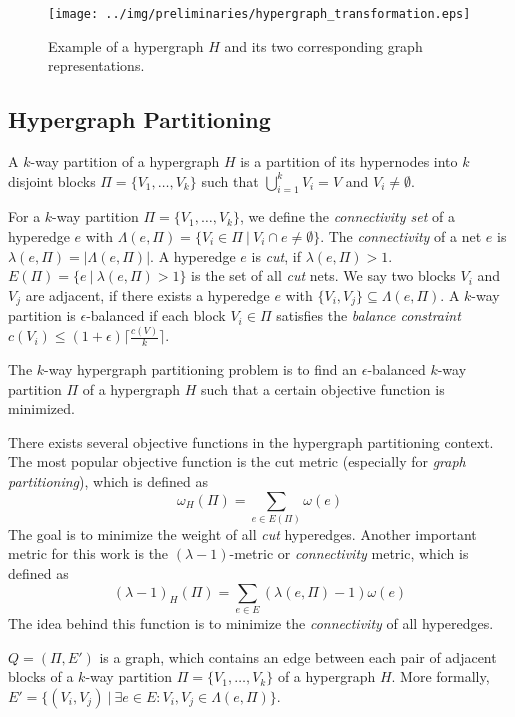 \begin{figure}
\centering
\texttt{[image: ../img/preliminaries/hypergraph\_transformation.eps]}
\caption{Example of a hypergraph $H$ and its two corresponding graph representations.} 
\label{img:hypergraph_transformation}
\end{figure}

\subsection{Hypergraph Partitioning}
\label{sec:hypergraph_partitioning}

\begin{definition}
A $k$-way partition of a hypergraph $H$ is a partition of its hypernodes into
$k$ disjoint blocks $\Pi = \{V_1,\ldots,V_k\}$ such that $\bigcup_{i=1}^{k} V_i = V$
and $V_i \neq \emptyset$.
\label{def:kway_partition}
\end{definition}

For a $k$-way partition $\Pi = \{V_1,\ldots,V_k\}$, we define the \emph{connectivity set} of a
hyperedge $e$ with $\Lambda(e,\Pi) = \{V_i \in \Pi\ |\ V_i \cap e \neq \emptyset\}$. The \emph{connectivity}
of a net $e$ is $\lambda(e,\Pi) = |\Lambda(e,\Pi)|$. A hyperedge $e$ is \emph{cut}, if
$\lambda(e,\Pi) > 1$. $E(\Pi) = \{e\ |\ \lambda(e,\Pi) > 1\}$ is the set of all \emph{cut} 
nets. We say two blocks $V_i$ and $V_j$ are adjacent, if there exists a hyperedge
$e$ with $\{V_i,V_j\} \subseteq \Lambda(e,\Pi)$. 
A $k$-way partition is $\epsilon$-balanced 
if each block $V_i \in \Pi$ satisfies the \emph{balance constraint} 
$c(V_i) \le (1+\epsilon)\lceil\frac{c(V)}{k}\rceil$.

\begin{definition}
The $k$-way hypergraph partitioning problem is to find an $\epsilon$-balanced $k$-way
partition $\Pi$ of a hypergraph $H$ such that a certain objective function is minimized.
\label{def:kway_partitioning_problem}
\end{definition}

There exists several objective functions in the hypergraph partitioning context. 
The most popular objective function 
is the $\text{cut}$ metric (especially for \emph{graph partitioning}), which is defined as
\[\omega_H(\Pi) = \sum_{e \in E(\Pi)} \omega(e)\]
The goal is to minimize the weight of all \emph{cut} hyperedges. Another important metric
for this work is the $(\lambda - 1)$-metric or \emph{connectivity} metric, 
which is defined as
\[(\lambda - 1)_H(\Pi) = \sum_{e \in E} (\lambda(e,\Pi) - 1)\omega(e)\]
The idea behind this function is to minimize the \emph{connectivity} of all hyperedges.

\begin{definition}
$Q = (\Pi,E')$ is a graph, which contains an edge between each pair of 
adjacent blocks of a $k$-way partition $\Pi = \{V_1,\ldots,V_k\}$ 
of a hypergraph $H$. More formally, 
$E' = \{(V_i,V_j)\ |\ \exists e \in E: V_i,V_j \in \Lambda(e,\Pi)\}$.
\label{def:quotient_graph}
\end{definition}